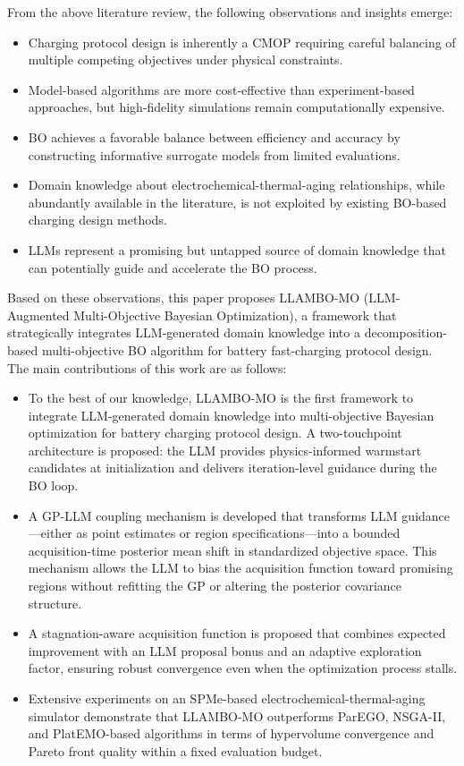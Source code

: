 \documentclass[lettersize,journal]{IEEEtran}
\begin{document}
From the above literature review, the following observations and insights emerge:
\begin{itemize}
\item Charging protocol design is inherently a CMOP requiring careful balancing of multiple competing objectives under physical constraints.
\item Model-based algorithms are more cost-effective than experiment-based approaches, but high-fidelity simulations remain computationally expensive.
\item BO achieves a favorable balance between efficiency and accuracy by constructing informative surrogate models from limited evaluations.
\item Domain knowledge about electrochemical-thermal-aging relationships, while abundantly available in the literature, is not exploited by existing BO-based charging design methods.
\item LLMs represent a promising but untapped source of domain knowledge that can potentially guide and accelerate the BO process.
\end{itemize}

Based on these observations, this paper proposes LLAMBO-MO (LLM-Augmented Multi-Objective Bayesian Optimization), a framework that strategically integrates LLM-generated domain knowledge into a decomposition-based multi-objective BO algorithm for battery fast-charging protocol design. The main contributions of this work are as follows:
\begin{itemize}
\item To the best of our knowledge, LLAMBO-MO is the first framework to integrate LLM-generated domain knowledge into multi-objective Bayesian optimization for battery charging protocol design. A two-touchpoint architecture is proposed: the LLM provides physics-informed warmstart candidates at initialization and delivers iteration-level guidance during the BO loop.
\item A GP-LLM coupling mechanism is developed that transforms LLM guidance---either as point estimates or region specifications---into a bounded acquisition-time posterior mean shift in standardized objective space. This mechanism allows the LLM to bias the acquisition function toward promising regions without refitting the GP or altering the posterior covariance structure.
\item A stagnation-aware acquisition function is proposed that combines expected improvement with an LLM proposal bonus and an adaptive exploration factor, ensuring robust convergence even when the optimization process stalls.
\item Extensive experiments on an SPMe-based electrochemical-thermal-aging simulator demonstrate that LLAMBO-MO outperforms ParEGO, NSGA-II, and PlatEMO-based algorithms in terms of hypervolume convergence and Pareto front quality within a fixed evaluation budget.
\end{itemize}
\end{document}
